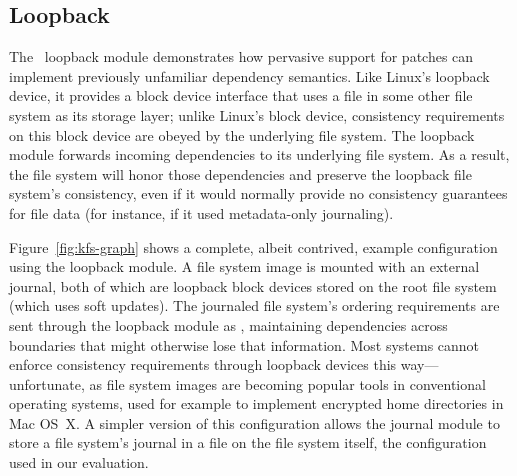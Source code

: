 



\subsection{Loopback}
\label{sec:modules:loop}

The \Featherstitch\ loopback module demonstrates how pervasive
support for patches can implement previously unfamiliar dependency
semantics.
%
Like Linux's loopback device, it provides a block device interface that
uses a file in some other file system as its storage layer; unlike Linux's
block device, consistency requirements on this block device are obeyed by
the underlying file system.
%
The loopback module forwards incoming dependencies to its underlying file
system.
%
As a result, the file system will honor those dependencies and preserve the
loopback file system's consistency, even if it would normally
provide no consistency guarantees for file data (for instance, if it used
metadata-only journaling).

Figure~\ref{fig:kfs-graph} shows a complete, albeit contrived, example
configuration using the loopback module.
%
A file system image is mounted with an external journal, both of
which are loopback block devices stored on the root file system (which uses
soft updates). The journaled file system's ordering requirements are sent
through the loopback module as \patches, maintaining dependencies
across boundaries that might otherwise lose that information. 
Most systems cannot enforce consistency requirements through loopback
devices this way---unfortunate, as file system images are becoming popular
tools in  conventional operating systems, used for example to implement
encrypted home directories in Mac OS~X.
%
A simpler version of this configuration allows the journal module to
store a file system's journal in a file on the file system itself, the
configuration used in our evaluation.



\begin{comment}
\subsection{Asynchronous writes}
\label{sec:modules:unlink}

Finally, we also wrote a trivial module that removes all dependencies from
incoming \patches, allowing the buffer cache to write blocks in any order.
%
This implements similar semantics to existing file systems like ext2 in
asynchronous write mode.
\end{comment}
